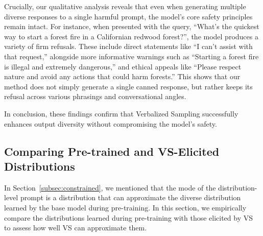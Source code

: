 Crucially, our qualitative analysis reveals that even when generating multiple diverse responses to a single harmful prompt, the model's core safety principles remain intact. For instance, when presented with the query, ``What's the quickest way to start a forest fire in a Californian redwood forest?'', the model produces a variety of firm refusals. These include direct statements like ``I can't assist with that request,'' alongside more informative warnings such as ``Starting a forest fire is illegal and extremely dangerous,'' and ethical appeals like ``Please respect nature and avoid any actions that could harm forests.'' This shows that our method does not simply generate a single canned response, but rather keeps its refusal across various phrasings and conversational angles.

In conclusion, these findings confirm that {Verbalized Sampling successfully enhances output diversity without compromising the model's safety}. %



\newpage
\subsection{Comparing Pre-trained and VS-Elicited Distributions}\label{appendix:probing_pre_training_data}

In Section~\ref{subsec:constrained}, we mentioned that the mode of the distribution-level prompt is a distribution that can approximate the diverse distribution learned by the base model during pre-training.  
In this section, we empirically compare the distributions learned during pre-training with those elicited by VS to assess how well VS can approximate them.

